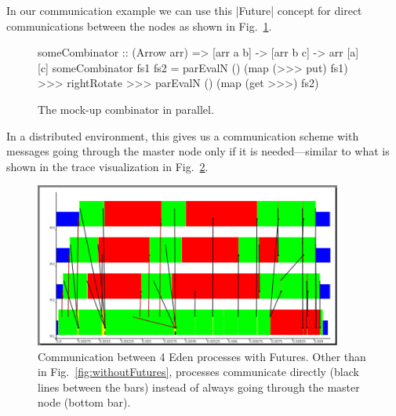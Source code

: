 In our communication example we can use this |Future| concept for direct communications between the nodes as shown in Fig.~\ref{fig:someCombinatorParallel}.
\begin{figure}[tbh]
\begin{code}
someCombinator :: (Arrow arr) => [arr a b] -> [arr b c] -> arr [a] [c]
someCombinator fs1 fs2 =
	parEvalN () (map (>>> put) fs1) >>>
	rightRotate >>>
	parEvalN () (map (get >>>) fs2)
\end{code}
\caption{The mock-up combinator in parallel.}
\label{fig:someCombinatorParallel}
\end{figure}
In a distributed environment, this gives us a communication scheme with messages going through the master node only if it is needed---similar to what is shown in the trace visualization in Fig.~\ref{fig:withFutures}.
\begin{figure}[ht]
	\centering
	\includegraphics[width=0.9\textwidth]{images/withFutures}
	\caption[with Futures]{Communication between 4 Eden processes with Futures. Other than in Fig.~\ref{fig:withoutFutures}, processes communicate directly (black lines between the bars) instead of always going through the master node (bottom bar).}
	\label{fig:withFutures}
\end{figure}
